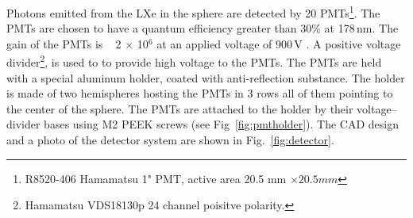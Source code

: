 \begin{figure}
\centering
\begin{minipage}[c]{0.6\textheight}
\centering
{}
\end{minipage}
\begin{minipage}[c]{0.35\textheight}
\centering
{}
\end{minipage}
\end{figure}



Photons emitted from the LXe in the sphere are detected by 20  PMTs\footnote{R8520-406 Hamamatsu 1" PMT, active area 20.5 mm $\times 20.5 mm$}. 
The PMTs are chosen to have a quantum efficiency greater than 30\% at 178\,nm. The gain of the PMTs is ~ 2 $\times$ 10$^6$ at an applied voltage of 900\,V . A positive voltage divider\footnote{Hamamatsu VDS18130p 24 channel poisitve polarity.}, is used to to provide high voltage to the PMTs. 
The PMTs are held with a special aluminum holder, coated with anti-reflection substance. 
The holder is made of two hemispheres hosting the PMTs in 3 rows all of them pointing to the 
center of the sphere. The PMTs are attached to the holder by their voltage--divider bases using M2 PEEK screws (see Fig~\ref{fig:pmtholder}). 
The CAD design and a photo of the detector system are shown 
in Fig.~\ref{fig:detector}.

